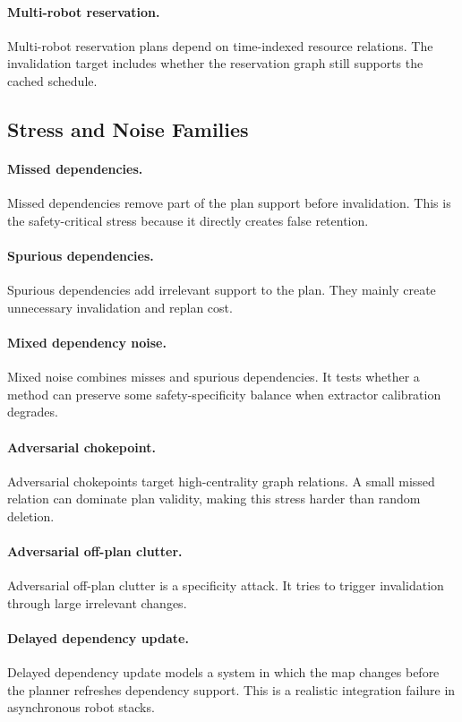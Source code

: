 \documentclass{article}
\begin{document}
\paragraph{Multi-robot reservation.}
Multi-robot reservation plans depend on time-indexed resource relations. The invalidation target includes whether the reservation graph still supports the cached schedule.

\subsection{Stress and Noise Families}

\paragraph{Missed dependencies.}
Missed dependencies remove part of the plan support before invalidation. This is the safety-critical stress because it directly creates false retention.

\paragraph{Spurious dependencies.}
Spurious dependencies add irrelevant support to the plan. They mainly create unnecessary invalidation and replan cost.

\paragraph{Mixed dependency noise.}
Mixed noise combines misses and spurious dependencies. It tests whether a method can preserve some safety-specificity balance when extractor calibration degrades.

\paragraph{Adversarial chokepoint.}
Adversarial chokepoints target high-centrality graph relations. A small missed relation can dominate plan validity, making this stress harder than random deletion.

\paragraph{Adversarial off-plan clutter.}
Adversarial off-plan clutter is a specificity attack. It tries to trigger invalidation through large irrelevant changes.

\paragraph{Delayed dependency update.}
Delayed dependency update models a system in which the map changes before the planner refreshes dependency support. This is a realistic integration failure in asynchronous robot stacks.
\end{document}
